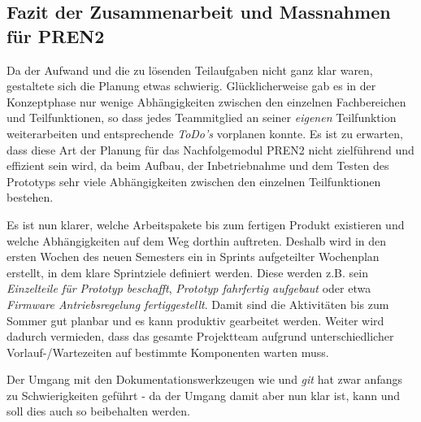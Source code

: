 \documentclass[main.tex]{subfiles} %
\begin{document}
\subsection*{Fazit der Zusammenarbeit und Massnahmen für PREN2}
Da der Aufwand und die zu lösenden Teilaufgaben nicht ganz klar waren,
gestaltete sich die Planung etwas schwierig. Glücklicherweise gab es in der
Konzeptphase nur wenige Abhängigkeiten zwischen den einzelnen Fachbereichen und
Teilfunktionen, so dass jedes Teammitglied an seiner \textit{eigenen}
Teilfunktion weiterarbeiten und entsprechende \textit{ToDo's} vorplanen konnte.
Es ist zu erwarten, dass diese Art der Planung für das Nachfolgemodul PREN2
nicht zielführend und effizient sein wird, da beim Aufbau, der Inbetriebnahme
und dem Testen des Prototyps sehr viele Abhängigkeiten zwischen den einzelnen
Teilfunktionen bestehen.

Es ist nun klarer, welche Arbeitspakete bis zum fertigen Produkt existieren und
welche Abhängigkeiten auf dem Weg dorthin auftreten. Deshalb wird in den ersten
Wochen des neuen Semesters ein in Sprints aufgeteilter Wochenplan erstellt, in
dem klare Sprintziele definiert werden. Diese werden z.B. sein
\textit{Einzelteile für Prototyp beschafft}, \textit{Prototyp fahrfertig
    aufgebaut} oder etwa \textit{Firmware Antriebsregelung
    fertiggestellt}. Damit sind die Aktivitäten bis zum Sommer gut planbar und es
kann produktiv gearbeitet werden. Weiter wird dadurch vermieden, dass das
gesamte Projektteam aufgrund unterschiedlicher Vorlauf-/Wartezeiten auf
bestimmte Komponenten warten muss.

Der Umgang mit den Dokumentationswerkzeugen wie \LaTex und \textit{git} hat
zwar anfangs zu Schwierigkeiten geführt - da der Umgang damit aber nun klar
ist, kann und soll dies auch so beibehalten werden.
\end{document}
